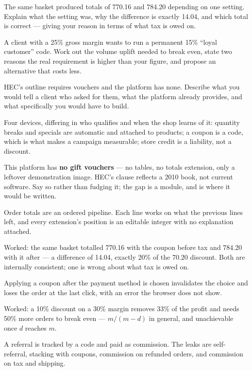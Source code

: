 \begin{checkpoint}
\begin{tightnum}
  \item The same basket produced totals of 770.16 and 784.20 depending on one
        setting. Explain what the setting was, why the difference is exactly
        14.04, and which total is correct --- giving your reason in terms of
        what tax is owed on.
  \item A client with a 25\% gross margin wants to run a permanent 15\% ``loyal
        customer'' code. Work out the volume uplift needed to break even, state
        two reasons the real requirement is higher than your figure, and
        propose an alternative that costs less.
  \item HEC's outline requires vouchers and the platform has none. Describe
        what you would tell a client who asked for them, what the platform
        already provides, and what specifically you would have to build.
\end{tightnum}
\end{checkpoint}

\begin{chaptersummary}
\begin{tight}
  \item Four devices, differing in who qualifies and when the shop learns of
        it: quantity breaks and specials are automatic and attached to
        products; a coupon is a code, which is what makes a campaign
        measurable; store credit is a liability, not a discount.
  \item This platform has \textbf{no gift vouchers} --- no tables, no totals
        extension, only a leftover demonstration image. HEC's clause reflects a
        2010 book, not current software. Say so rather than fudging it; the
        gap is a module, and  is where it would be written.
  \item Order totals are an ordered pipeline. Each line works on what the
        previous lines left, and every extension's position is an editable
        integer with no explanation attached.
  \item Worked: the same basket totalled 770.16 with the coupon before tax and
        784.20 with it after --- a difference of 14.04, exactly 20\% of the
        70.20 discount. Both are internally consistent; one is wrong about what
        tax is owed on.
  \item Applying a coupon after the payment method is chosen invalidates the
        choice and loses the order at the last click, with an error the browser
        does not show.
  \item Worked: a 10\% discount on a 30\% margin removes 33\% of the profit and
        needs 50\% more orders to break even --- $m/(m-d)$ in general, and
        unachievable once $d$ reaches $m$.
  \item A referral is tracked by a code and paid as commission. The leaks are
        self-referral, stacking with coupons, commission on refunded orders,
        and commission on tax and shipping.
\end{tight}
\end{chaptersummary}

